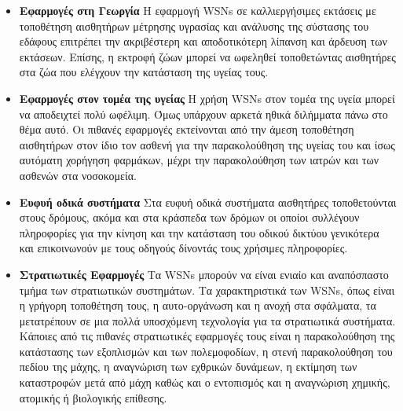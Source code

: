 \begin{itemize}
\item \textbf{Εφαρμογές στη Γεωργία} Η εφαρμογή WSNs σε καλλιεργήσιμες εκτάσεις με τοποθέτηση αισθητήρων μέτρησης υγρασίας και ανάλυσης της σύστασης του
εδάφους επιτρέπει την ακριβέστερη και αποδοτικότερη λίπανση και άρδευση των εκτάσεων.
Επίσης, η εκτροφή ζώων μπορεί να ωφεληθεί τοποθετώντας αισθητήρες στα ζώα που ελέγχουν την κατάσταση της υγείας τους.
\item \textbf{Εφαρμογές στον τομέα της υγείας} Η χρήση WSNs στον τομέα της υγεία μπορεί να αποδειχτεί πολύ ωφέλιμη.
Όμως υπάρχουν αρκετά ηθικά διλήμματα πάνω στο θέμα αυτό.
Οι πιθανές εφαρμογές εκτείνονται από την άμεση τοποθέτηση αισθητήρων στον ίδιο τον ασθενή για την παρακολούθηση της υγείας του και ίσως αυτόματη χορήγηση φαρμάκων,
μέχρι την παρακολούθηση των ιατρών και των ασθενών στα νοσοκομεία.
\item \textbf{Ευφυή οδικά συστήματα} Στα ευφυή οδικά συστήματα αισθητήρες τοποθετούνται στους δρόμους, ακόμα και στα κράσπεδα των δρόμων οι οποίοι
συλλέγουν πληροφορίες για την κίνηση και την κατάσταση του οδικού δικτύου γενικότερα και επικοινωνούν με τους οδηγούς δίνοντάς τους χρήσιμες πληροφορίες.
\item \textbf{Στρατιωτικές Εφαρμογές} Τα WSNs μπορούν να είναι ενιαίο και αναπόσπαστο τμήμα των στρατιωτικών συστημάτων.
Τα χαρακτηριστικά των WSNs, όπως είναι η γρήγορη τοποθέτηση τους, η αυτο-οργάνωση και η ανοχή στα σφάλματα, τα μετατρέπουν σε μια πολλά υποσχόμενη τεχνολογία για τα
στρατιωτικά συστήματα.
Κάποιες από τις πιθανές στρατιωτικές εφαρμογές τους είναι η παρακολούθηση της κατάστασης των εξοπλισμών και των πολεμοφοδίων, η στενή παρακολούθηση του πεδίου της
μάχης, η αναγνώριση των εχθρικών δυνάμεων, η εκτίμηση των καταστροφών μετά από μάχη καθώς και ο εντοπισμός και η αναγνώριση χημικής, ατομικής ή βιολογικής επίθεσης.
\end{itemize}



